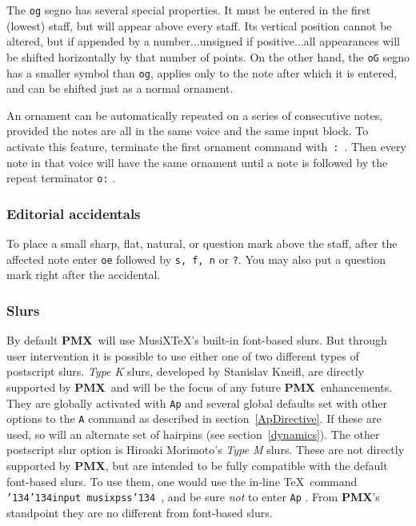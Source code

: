 \documentclass[11pt]{article}
\def\MusiXTeX{MusiX\TeX}
\def\bs{{\tt\char'134}}
\newcommand\PMXX{\textbf{PMX}}
\newcommand\PMX{\PMXX~}
\def\newfrom{2.59}  %
\def\NEW#1{\ifdim#1 pt<\newfrom pt\else%
\marginpar{\fbox{#1}}\fi}
\begin{document}
The {\tt og} segno has several special properties. It must be entered in the first (lowest) 
staff, but will appear above
every staff. Its vertical position cannot be altered, but if appended by a number...unsigned
if positive...all appearances will be shifted horizontally by that number of points. On the 
other hand, the {\tt oG} segno\NEW{2.71} has a smaller symbol than {\tt og}, 
applies only to the note after which it is entered, and can be shifted just as a 
normal ornament.

     An ornament can be automatically repeated on a series of consecutive notes,
provided the notes are all in the same voice and the same input block.  
To activate this feature, terminate  
the first ornament command with~{\tt:}~.  Then every note in that voice will 
have the same ornament until a note is followed by the repeat terminator
{\tt o:} . 

\subsubsection{Editorial accidentals}

     To place a small sharp, flat, natural, or question mark above the staff, 
after the affected note enter {\tt oe} followed by {\tt s, f, n} or {\tt ?}. 
\NEW{2.2} You may also put a question mark right after the accidental.

\subsubsection{Slurs} \label{slurs}

        By default \PMX will use \MusiXTeX's built-in font-based slurs.
But through user intervention it is possible to use either one of 
\NEW{2.4}two different types of postscript slurs. {\it Type K} slurs, 
developed by Stanislav Kneifl, are directly supported by \PMX and will
be the focus of any future \PMX enhancements. 
They are globally activated with {\tt Ap} and several global
defaults set with other options to the {\tt A} command as described in
section~\ref{ApDirective}. If these are used, so will an alternate
set of hairpins (see section~\ref{dynamics}).   
The other postscript slur option is Hiroaki Morimoto's {\it Type M} slurs. 
These
are not directly supported by \PMXX, but are intended to be fully
compatible with the default font-based slurs. To use them, one would
use the in-line \TeX~command \bs\bs{\tt input musixpss}\bs~, and be sure
{\it not} to enter {\tt Ap} .  From \PMXX's standpoint they are no different
from font-based slurs.
\end{document}
